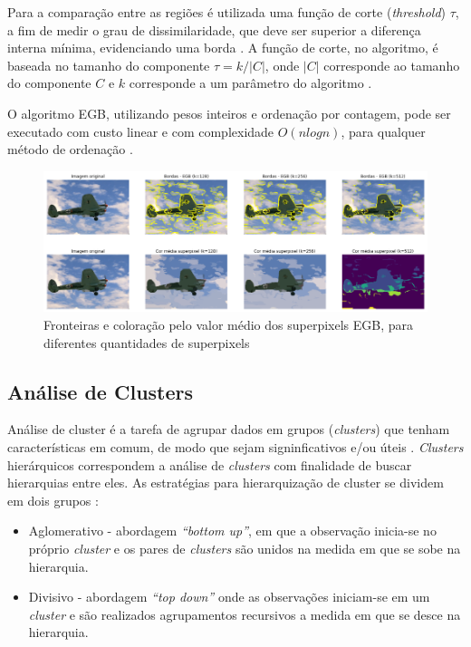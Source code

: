 \begin{document}
Para a comparação entre as regiões é utilizada uma função de corte (\textit{threshold}) $\tau$, a fim de medir o grau de dissimilaridade, que deve ser superior a diferença interna mínima, evidenciando uma borda \cite{FELZENSZWALB}. A função de corte, no algoritmo, é baseada no tamanho do componente $\tau=k/|C|$, onde $|C|$ corresponde ao tamanho do componente $C$ e $k$ corresponde a um parâmetro do algoritmo \cite{FELZENSZWALB}.

O algoritmo EGB, utilizando pesos inteiros e ordenação por contagem, pode ser executado com custo linear e com complexidade $O(nlogn)$, para qualquer método de ordenação \cite{FELZENSZWALB}. 

\begin{figure}[ht]
\centering
\includegraphics[width=1.\textwidth]{felz_segmentation_compare.png}
\caption{Fronteiras e coloração pelo valor médio dos superpixels EGB, para diferentes quantidades de superpixels}
\label{fig:EGB}
\end{figure}


\subsection{Análise de Clusters} \label{ssec:clusters}

Análise de cluster é a tarefa de agrupar dados em grupos (\textit{clusters}) que tenham características em comum, de modo que sejam signinficativos e/ou úteis \cite{CLUSTER_HIER}. \textit{Clusters} hierárquicos correspondem a análise de \textit{clusters} com finalidade de buscar hierarquias entre eles. As estratégias para hierarquização de cluster se dividem em dois grupos \cite{ROKACH}:

\begin{itemize}
 \item Aglomerativo - abordagem \textit{``bottom up''}, em que a observação inicia-se no próprio \textit{cluster} e os pares de \textit{clusters} são unidos na medida em que se sobe na hierarquia. 
 \item Divisivo - abordagem \textit{``top down''} onde as observações iniciam-se em um \textit{cluster} e são realizados agrupamentos recursivos a medida em que se desce na hierarquia.
\end{itemize}
\end{document}

